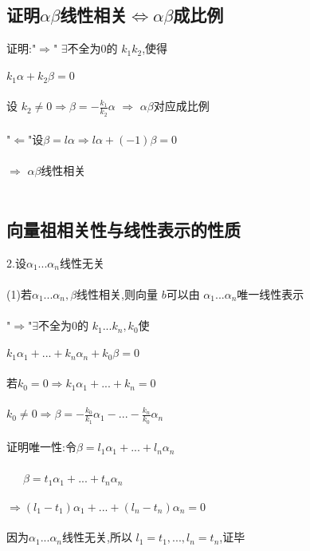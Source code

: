 \documentclass[12pt]{article}
\begin{document}
\subsection{证明$\alpha \beta$线性相关$\Leftrightarrow \alpha \beta$成比例}
证明:"$\Rightarrow$" $\exists$不全为0的 $k_1k_2$,使得 \\ \\
 $k_1\alpha+k_2\beta=0$ \\ \\
 设  $k_2\neq0 \Rightarrow \beta = - \frac{k_1}{k_2}\alpha$ $\Rightarrow$ $\alpha\beta$对应成比例 \\ \\
 "$\Leftarrow$"设$\beta=l\alpha \Rightarrow l\alpha+(-1)\beta=0$ \\ \\
  $\Rightarrow$  $\alpha \beta$线性相关 \\ \\
\subsection{向量祖相关性与线性表示的性质}
2.设$\alpha_1...\alpha_n$线性无关 \\ \\
(1)若$\alpha_1...\alpha_n,\beta$线性相关,则向量 $b$可以由 $\alpha_1...\alpha_n$唯一线性表示 \\ \\
"$\Rightarrow$"$\exists$不全为0的 $k_1...k_n,k_0$使 \\ \\
 $k_1\alpha_1+...+k_n\alpha_n+k_0\beta=0$ \\ \\
若$k_0=0\Rightarrow k_1\alpha_1+...+k_n=0$\\ \\
$k_0 \neq 0 \Rightarrow \beta=-\frac{k_0}{k_1}\alpha_1-...-\frac{k_n}{k_0}\alpha_n$ \\ \\

证明唯一性:令$\beta=l_1\alpha_1+...+l_n\alpha_n$ \\ \\ 
\ \ \ $\beta=t_1\alpha_1+...+t_n\alpha_n$ \\ \\
$\Rightarrow (l_1-t_1)\alpha_1+...+(l_n-t_n)\alpha_n=0$ \\ \\
因为$\alpha_1...\alpha_n$线性无关,所以  $l_1=t_1,...,l_n=t_n$,证毕 \\ \\
\end{document}
